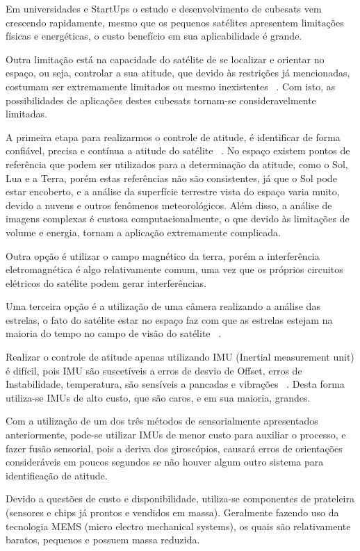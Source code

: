 Em universidades e StartUps o estudo e desenvolvimento de cubesats vem crescendo rapidamente, mesmo que os pequenos satélites apresentem limitações físicas e energéticas, o custo benefício em sua aplicabilidade é grande.

Outra limitação está na capacidade do satélite de se localizar e orientar no espaço, ou seja, controlar a sua atitude, que devido às restrições já mencionadas, costumam ser extremamente limitados ou mesmo inexistentes ~\cite[]{Diaz}. Com isto, as possibilidades de aplicações destes cubesats tornam-se consideravelmente limitadas.

A primeira etapa para realizarmos o controle de atitude, é identificar de forma confiável, precisa e contínua a atitude do satélite ~\cite[]{Diaz}. No espaço existem pontos de referência que podem ser utilizados para a determinação da atitude, como o Sol, Lua e a Terra, porém estas referências não são consistentes, já que o Sol pode estar encoberto, e a análise da superfície terrestre vista do espaço varia muito, devido a nuvens e outros fenômenos meteorológicos. Além disso, a análise de imagens complexas é custosa computacionalmente, o que devido às limitações de volume e energia, tornam a aplicação extremamente complicada.

Outra opção é utilizar o campo magnético da terra, porém a interferência eletromagnética é algo relativamente comum, uma vez que os próprios circuitos elétricos do satélite podem gerar interferências.

Uma terceira opção é a utilização de uma câmera realizando a análise das estrelas, o fato do satélite estar no espaço faz com que as estrelas estejam na maioria do tempo no campo de visão do satélite ~\cite[]{Tappe}.

Realizar o controle de atitude apenas utilizando IMU (Inertial measurement unit)  é difícil, pois IMU são suscetíveis a erros de desvio de Offset, erros de Instabilidade, temperatura, são sensíveis a pancadas e vibrações ~\cite[]{Young}. Desta forma utiliza-se IMUs de alto custo, que são caros, e em sua maioria, grandes. 

Com a utilização de um dos três métodos de sensorialmente apresentados anteriormente, pode-se utilizar IMUs de menor custo para auxiliar o processo, e fazer fusão sensorial, pois a deriva dos giroscópios, causará erros de orientações consideráveis em poucos segundos se não houver algum outro sistema para identificação de atitude.

Devido a questões de custo e disponibilidade, utiliza-se componentes de prateleira (sensores e chips já prontos e vendidos em massa). Geralmente fazendo uso da tecnologia MEMS (micro electro mechanical systems), os quais são relativamente baratos, pequenos e possuem massa reduzida. 



